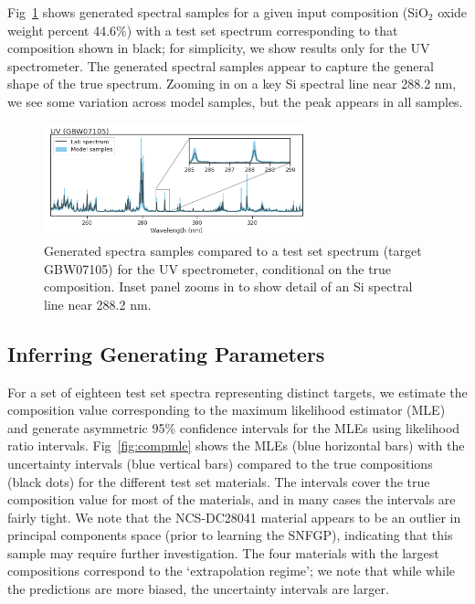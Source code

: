 \documentclass[letterpaper]{article} %
\begin{document}
Fig~\ref{fig:genspectra} shows generated spectral samples for a given input composition (SiO$_2$ oxide weight percent 44.6\%) with a test set spectrum corresponding to that composition shown in black; for simplicity, we show results only for the UV spectrometer.
The generated spectral samples appear to capture the general shape of the true spectrum.
Zooming in on a key Si spectral line near 288.2 nm, we see some variation across model samples, but the peak appears in all samples.

\vspace{-3.08mm}
\begin{figure}
\centering
\includegraphics[width=0.9\linewidth,height=1.3in ]{figures/uvspectra.png}
\caption{Generated spectra samples compared to a test set spectrum (target GBW07105) for the UV spectrometer, conditional on the true composition. Inset panel zooms in to show detail of an Si spectral line near 288.2 nm.}
\label{fig:genspectra}
\end{figure}

\subsection{Inferring Generating Parameters}
For a set of eighteen test set spectra representing distinct targets, we estimate the composition value corresponding to the maximum likelihood estimator (MLE) and generate asymmetric 95\% confidence intervals for the MLEs using likelihood ratio intervals.
Fig~\ref{fig:compmle} shows the MLEs (blue horizontal bars) with the uncertainty intervals (blue vertical bars) compared to the true compositions (black dots) for the different test set materials.
The intervals cover the true composition value for most of the materials, and in many cases the intervals are fairly tight.
We note that the NCS-DC28041 material appears to be an outlier in principal components space (prior to learning the SNFGP), indicating that this sample may require further investigation.
The four materials with the largest compositions correspond to the `extrapolation regime'; we note that while while the predictions are more biased, the uncertainty intervals are larger.
\end{document}
